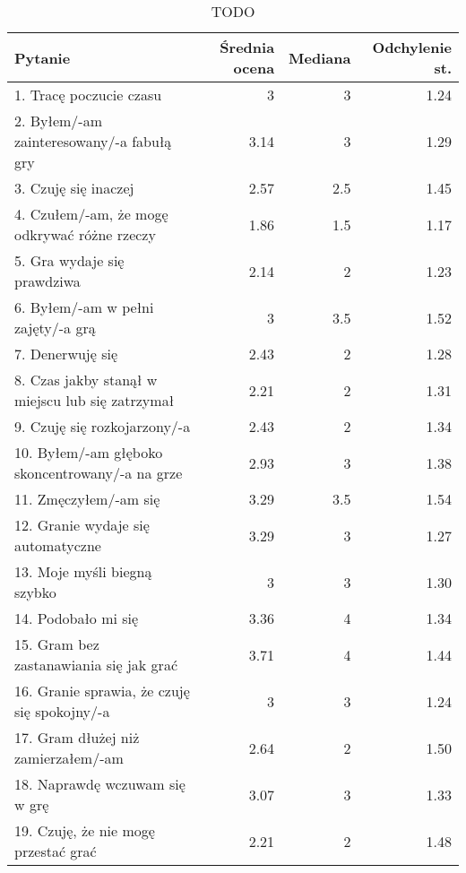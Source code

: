 \begin{table}[h!]
    \begin{center}
        \begin{tabular}{|l|r|r|r|}
            \hline
            Pytanie & Średnia ocena & Mediana & Odchylenie st. \\
            \hline
            1. Tracę poczucie czasu & 3 & 3 & 1.24 \\
            2. Byłem/-am zainteresowany/-a fabułą gry & 3.14 & 3 & 1.29 \\
            3. Czuję się inaczej & 2.57 & 2.5 & 1.45 \\
            4. Czułem/-am, że mogę odkrywać różne rzeczy & 1.86 & 1.5 & 1.17 \\
            5. Gra wydaje się prawdziwa & 2.14 & 2 & 1.23 \\
            6. Byłem/-am w pełni zajęty/-a grą & 3 & 3.5 & 1.52 \\
            7. Denerwuję się & 2.43 & 2 & 1.28 \\
            8. Czas jakby stanął w miejscu lub się zatrzymał & 2.21 & 2 & 1.31 \\
            9. Czuję się rozkojarzony/-a & 2.43 & 2 & 1.34 \\
            10. Byłem/-am głęboko skoncentrowany/-a na grze & 2.93 & 3 & 1.38 \\
            11. Zmęczyłem/-am się & 3.29 & 3.5 & 1.54 \\
            12. Granie wydaje się automatyczne & 3.29 & 3 & 1.27 \\
            13. Moje myśli biegną szybko & 3 & 3 & 1.30 \\
            14. Podobało mi się & 3.36 & 4 & 1.34 \\
            15. Gram bez zastanawiania się jak grać & 3.71 & 4 & 1.44 \\
            16. Granie sprawia, że czuję się spokojny/-a & 3 & 3 & 1.24 \\
            17. Gram dłużej niż zamierzałem/-am & 2.64 & 2 & 1.50 \\
            18. Naprawdę wczuwam się w grę & 3.07 & 3 & 1.33 \\
            19. Czuję, że nie mogę przestać grać & 2.21 & 2 & 1.48 \\
            \hline
        \end{tabular}
    \end{center}
    \caption{TODO}\label{tab1:ch7_6}
\end{table}

